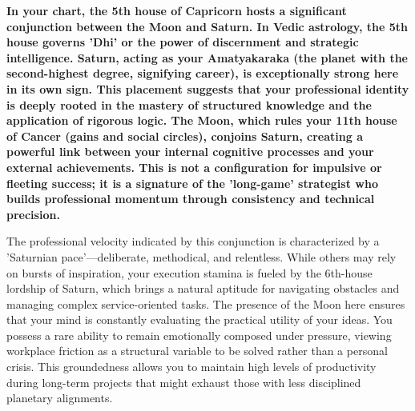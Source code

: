 
\label{topic21}

{\fontsize{9.5}{13.8}\selectfont\bfseries\color{DeepSlate} In your chart, the 5th house of Capricorn hosts a significant conjunction between the Moon and Saturn. In Vedic astrology, the 5th house governs 'Dhi' or the power of discernment and strategic intelligence. Saturn, acting as your Amatyakaraka (the planet with the second-highest degree, signifying career), is exceptionally strong here in its own sign. This placement suggests that your professional identity is deeply rooted in the mastery of structured knowledge and the application of rigorous logic. The Moon, which rules your 11th house of Cancer (gains and social circles), conjoins Saturn, creating a powerful link between your internal cognitive processes and your external achievements. This is not a configuration for impulsive or fleeting success; it is a signature of the 'long-game' strategist who builds professional momentum through consistency and technical precision.}\par\vspace{2mm}

{\fontsize{9}{13}\selectfont The professional velocity indicated by this conjunction is characterized by a 'Saturnian pace'---deliberate, methodical, and relentless. While others may rely on bursts of inspiration, your execution stamina is fueled by the 6th-house lordship of Saturn, which brings a natural aptitude for navigating obstacles and managing complex service-oriented tasks. The presence of the Moon here ensures that your mind is constantly evaluating the practical utility of your ideas. You possess a rare ability to remain emotionally composed under pressure, viewing workplace friction as a structural variable to be solved rather than a personal crisis. This groundedness allows you to maintain high levels of productivity during long-term projects that might exhaust those with less disciplined planetary alignments.}\par\vspace{1.8mm}

